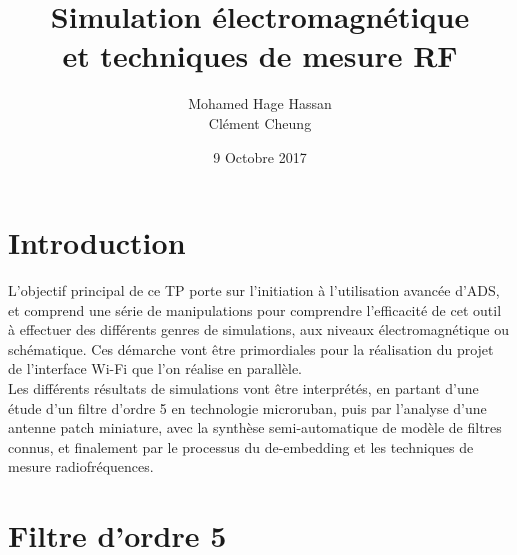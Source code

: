 \documentclass[a4paper]{article}
\begin{document}
\newcommand\textstyleEmphasis[1]{\textit{#1}}
\renewcommand{\contentsname}{Table des mati\`eres}
\renewcommand\refname{R\'ef\'erences}

\renewcommand{\abstractname}{Pr\'eambule}
\title{\textbf{Simulation \'electromagn\'etique \\ et techniques de mesure RF}}
\author{Mohamed Hage Hassan \\ Cl\'ement Cheung}
\date{9 Octobre 2017}
\maketitle
\thispagestyle{empty}

\tableofcontents
\clearpage

\section{Introduction}
L'objectif principal de ce TP porte sur l'initiation \`a l'utilisation avanc\'ee d'ADS, et comprend une s\'erie de
 manipulations pour comprendre l'efficacit\'e de cet outil \`a effectuer des diff\'erents genres de simulations,
 aux niveaux \'electromagn\'etique ou sch\'ematique. Ces d\'emarche vont \^etre primordiales pour la r\'ealisation du projet
 de l'interface Wi-Fi que l'on r\'ealise en parall\`ele.\\


Les diff\'erents r\'esultats de simulations vont \^etre interpr\'et\'es, en partant d'une \'etude d'un filtre d'ordre 5
en technologie microruban, puis par l'analyse d'une antenne patch miniature, avec la synth\`ese semi-automatique de
mod\`ele de filtres connus, et finalement par le processus du de-embedding et les techniques de mesure radiofr\'equences.

\section{Filtre d'ordre 5}
\end{document}
